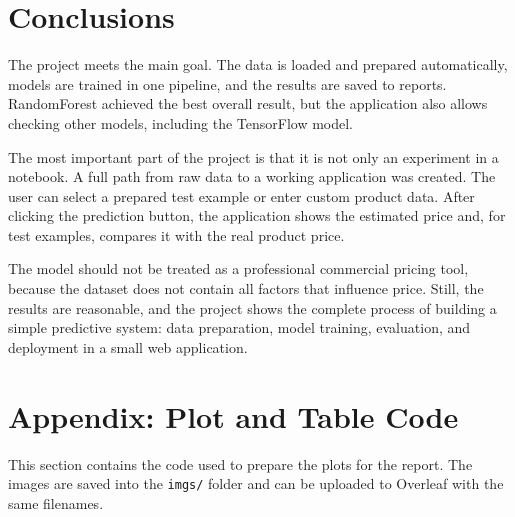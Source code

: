 \documentclass[12pt,a4paper]{article}
\begin{document}
\section{Conclusions}

The project meets the main goal. The data is loaded and prepared automatically, models are trained in one pipeline, and the results are saved to reports. RandomForest achieved the best overall result, but the application also allows checking other models, including the TensorFlow model.

The most important part of the project is that it is not only an experiment in a notebook. A full path from raw data to a working application was created. The user can select a prepared test example or enter custom product data. After clicking the prediction button, the application shows the estimated price and, for test examples, compares it with the real product price.

The model should not be treated as a professional commercial pricing tool, because the dataset does not contain all factors that influence price. Still, the results are reasonable, and the project shows the complete process of building a simple predictive system: data preparation, model training, evaluation, and deployment in a small web application.

\section{Appendix: Plot and Table Code}

This section contains the code used to prepare the plots for the report. The images are saved into the \texttt{imgs/} folder and can be uploaded to Overleaf with the same filenames.
\end{document}
